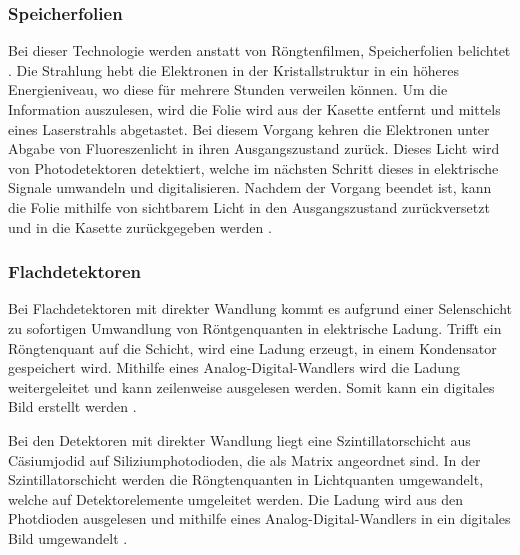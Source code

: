 \subsubsection{Speicherfolien}
\label{subsubsec:Speicherfolien}
Bei dieser Technologie werden anstatt von Röngtenfilmen, Speicherfolien belichtet \cite{MedizinischePhysik}. Die Strahlung hebt die Elektronen in der
Kristallstruktur in ein höheres Energieniveau, wo diese für mehrere Stunden verweilen können. Um die Information auszulesen, wird 
die Folie wird aus der Kasette entfernt und mittels eines Laserstrahls abgetastet. Bei diesem Vorgang kehren die Elektronen unter
Abgabe von Fluoreszenlicht in ihren Ausgangszustand zurück. Dieses Licht wird von Photodetektoren detektiert, welche
im nächsten Schritt dieses in elektrische Signale umwandeln und digitalisieren. Nachdem der Vorgang beendet ist, kann die Folie 
mithilfe von sichtbarem Licht in den Ausgangszustand zurückversetzt und in die Kasette zurückgegeben werden \cite{Medizintechnik}.


\subsubsection{Flachdetektoren}
\label{subsubsec:Flachdetektoren}

Bei Flachdetektoren mit direkter Wandlung kommt es aufgrund einer Selenschicht zu sofortigen Umwandlung von Röntgenquanten in
elektrische Ladung. Trifft ein Röngtenquant auf die Schicht, wird eine Ladung erzeugt, in einem Kondensator gespeichert wird. Mithilfe
eines Analog-Digital-Wandlers wird die Ladung weitergeleitet und kann zeilenweise ausgelesen werden. Somit kann ein digitales Bild
erstellt werden \cite{Artikel}. 

Bei den Detektoren mit direkter Wandlung liegt eine Szintillatorschicht aus Cäsiumjodid auf Siliziumphotodioden, die als Matrix
angeordnet sind. In der Szintillatorschicht werden die Röngtenquanten in Lichtquanten umgewandelt, welche auf Detektorelemente umgeleitet 
werden. Die Ladung wird aus den Photdioden ausgelesen und mithilfe eines Analog-Digital-Wandlers in ein digitales Bild umgewandelt
 \cite{Artikel}.






